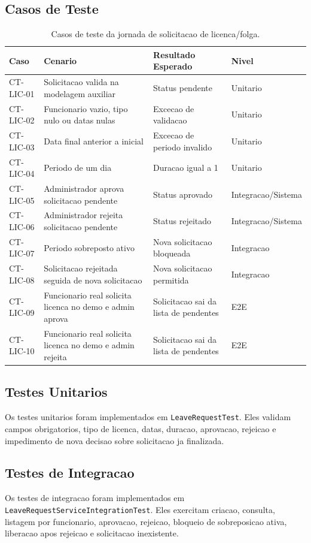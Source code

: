 \subsection{Casos de Teste}
\begin{table}[h]
\centering
\begin{tabular}{|p{2.1cm}|p{6.0cm}|p{3.0cm}|p{3.0cm}|}
\hline
\textbf{Caso} & \textbf{Cenario} & \textbf{Resultado Esperado} & \textbf{Nivel} \\
\hline
CT-LIC-01 & Solicitacao valida na modelagem auxiliar & Status pendente & Unitario \\
\hline
CT-LIC-02 & Funcionario vazio, tipo nulo ou datas nulas & Excecao de validacao & Unitario \\
\hline
CT-LIC-03 & Data final anterior a inicial & Excecao de periodo invalido & Unitario \\
\hline
CT-LIC-04 & Periodo de um dia & Duracao igual a 1 & Unitario \\
\hline
CT-LIC-05 & Administrador aprova solicitacao pendente & Status aprovado & Integracao/Sistema \\
\hline
CT-LIC-06 & Administrador rejeita solicitacao pendente & Status rejeitado & Integracao/Sistema \\
\hline
CT-LIC-07 & Periodo sobreposto ativo & Nova solicitacao bloqueada & Integracao \\
\hline
CT-LIC-08 & Solicitacao rejeitada seguida de nova solicitacao & Nova solicitacao permitida & Integracao \\
\hline
CT-LIC-09 & Funcionario real solicita licenca no demo e admin aprova & Solicitacao sai da lista de pendentes & E2E \\
\hline
CT-LIC-10 & Funcionario real solicita licenca no demo e admin rejeita & Solicitacao sai da lista de pendentes & E2E \\
\hline
\end{tabular}
\caption{Casos de teste da jornada de solicitacao de licenca/folga.}
\end{table}

\subsection{Testes Unitarios}
Os testes unitarios foram implementados em \texttt{LeaveRequestTest}. Eles validam campos obrigatorios, tipo de licenca, datas, duracao, aprovacao, rejeicao e impedimento de nova decisao sobre solicitacao ja finalizada.

\subsection{Testes de Integracao}
Os testes de integracao foram implementados em \texttt{LeaveRequestServiceIntegrationTest}. Eles exercitam criacao, consulta, listagem por funcionario, aprovacao, rejeicao, bloqueio de sobreposicao ativa, liberacao apos rejeicao e solicitacao inexistente.

